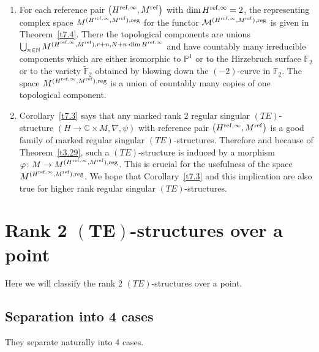 \documentclass[pdftex]{sigma}%
\numberwithin{equation}{section}
\numberwithin{figure}{section}
\newcommand{\N}{{\mathbb N}}
\newcommand{\C}{{\mathbb C}}
\renewcommand{\P}{{\mathbb P}}
\newcommand{\F}{{\mathbb F}}
\newcommand{\MM}{{\mathcal M}}
\newcommand{\www}{\widetilde}
\newcommand{\nnn}{\nabla}
\begin{document}
\begin{Remarks}%
\quad
\begin{enumerate}\itemsep=0pt
\item[$(i)$] For each reference pair $\big(H^{{\rm ref},\infty},M^{\rm ref}\big)$
with $\dim H^{{\rm ref},\infty}=2$,
the representing complex space
$M^{(H^{{\rm ref},\infty},M^{\rm ref}),{\rm reg}}$
for the functor $\MM^{(H^{{\rm ref},\infty},M^{\rm ref}),{\rm reg}}$
is given in Theorem~\ref{t7.4}.
There the topological components are unions
$\bigcup_{n\in\N}M^{(H^{{\rm ref},\infty},M^{\rm ref}),r+n,N+n\cdot\dim H^{{\rm ref},\infty}}$
and have countably many irreducible components which are either isomorphic
to $\P^1$ or to the Hirzebruch surface $\F_2$ or to the variety $\www\F_2$
obtained by blowing down the $(-2)$-curve in $\F_2$.
The space
$M^{(H^{{\rm ref},\infty},M^{\rm ref}),{\rm reg}}$ is a union of
countably many copies of one topological component.

\item[$(ii)$] Corollary~\ref{t7.3} says that any marked rank $2$
regular singular $(TE)$-structure $(H\to\C\times M,\nnn,\psi)$
with reference pair $\big(H^{{\rm ref},\infty},M^{\rm ref}\big)$ is
a good family of marked regular singular $(TE)$-structures.
Therefore and because of Theorem~\ref{t3.29},
such a $(TE)$-structure is induced by a morphism
$\varphi\colon M\to M^{(H^{{\rm ref},\infty},M^{\rm ref}),{\rm reg}}$.
This is crucial for the usefulness of the
space $M^{(H^{{\rm ref},\infty},M^{\rm ref}),{\rm reg}}$.
We hope that Corollary~\ref{t7.3} and this implication
are also true for higher rank regular singular
$(TE)$-structures.
\end{enumerate}
\end{Remarks}

\section[Rank 2 $(TE)$-structures over a point]{Rank 2 $\boldsymbol{(TE)}$-structures over a point}\label{c4}

Here we will classify the rank $2$ $(TE)$-structures over
a point.

\subsection{Separation into 4 cases}%
They separate naturally into 4 cases.
\end{document}
